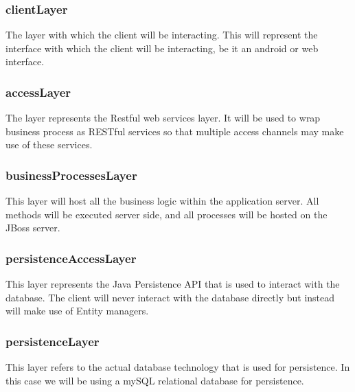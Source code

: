 \documentclass[a4paper,12pt]{article}
\begin{document}
	
	\subsubsection{clientLayer}
	The layer with which the client will be interacting. This will represent the interface with which the client will be interacting, be it an android or web interface.
	\subsubsection{accessLayer}
	The layer represents the Restful web services layer. It will be used to wrap business process as RESTful services so that multiple access channels may make use of these services. 
	\subsubsection{businessProcessesLayer}
	This layer will host all the business logic within the application server. All methods will be executed server side, and all processes will be hosted on the JBoss server.
	\subsubsection{persistenceAccessLayer}
	This layer represents the Java Persistence API that is used to interact with the database. The client will never interact with the database directly but instead will make use of Entity managers.
	\subsubsection{persistenceLayer}
	This layer refers to the actual database technology that is used for persistence. In this case we will be using a mySQL relational database for persistence.
	
\end{document}
